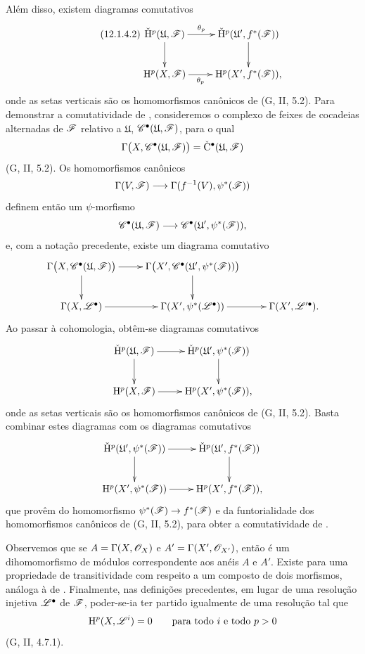 \begin{env}[12.1.4]
Além disso, existem diagramas comutativos
\[
\label{0.12.1.4.2}
\tag{12.1.4.2}
  \xymatrix{
    \check{\HH}^p(\mathfrak{U},\sh{F})
      \ar[r]^-{\theta_p}\ar[d]
      & \check{\HH}^p(\mathfrak{U}',f^*(\sh{F}))\ar[d]\\
    \HH^p(X,\sh{F})
      \ar[r]_-{\theta_p}
      & \HH^p(X',f^*(\sh{F})),
  }
\]
onde as setas verticais são os homomorfismos canônicos de
(G, II, 5.2).
Para demonstrar a comutatividade de , consideremos o
complexo de feixes de cocadeias alternadas de $\mathscr{F}$ relativo a
$\mathfrak{U}$,
$\mathscr{C}^\bullet(\mathfrak{U},\mathscr{F})$, para o qual
\[
  \Gamma\bigl(X,\mathscr{C}^\bullet(\mathfrak{U},\mathscr{F})\bigr)
  =
  \check{\mathrm{C}}^\bullet(\mathfrak{U},\mathscr{F})
\]
(G, II, 5.2).
Os homomorfismos canônicos
\[
  \Gamma(V,\mathscr{F})
  \longrightarrow
  \Gamma(f^{-1}(V),\psi^*(\mathscr{F}))
\]
definem então um $\psi$-morfismo
\[
  \mathscr{C}^\bullet(\mathfrak{U},\mathscr{F})
  \longrightarrow
  \mathscr{C}^\bullet(\mathfrak{U}',\psi^*(\mathscr{F})),
\]
e, com a notação precedente, existe um diagrama comutativo
\[
  \xymatrix{
    \Gamma\bigl(X,\sh{C}^\bullet(\mathfrak{U},\sh{F})\bigr)
      \ar[r]\ar[d]
      & \Gamma\bigl(X',
          \sh{C}^\bullet(\mathfrak{U}',\psi^*(\sh{F}))\bigr)\ar[d]\\
    \Gamma(X,\sh{L}^\bullet)\ar[r]
      & \Gamma(X',\psi^*(\sh{L}^\bullet))\ar[r]
      & \Gamma(X',\sh{L}'^\bullet).
  }
\]
Ao passar à cohomologia, obtêm-se diagramas comutativos
\[
  \xymatrix{
    \check{\HH}^p(\mathfrak{U},\sh{F})\ar[r]\ar[d]
      & \check{\HH}^p(\mathfrak{U}',\psi^*(\sh{F}))\ar[d]\\
    \HH^p(X,\sh{F})\ar[r]
      & \HH^p(X',\psi^*(\sh{F})),
  }
\]
onde as setas verticais são os homomorfismos canônicos de
(G, II, 5.2).
Basta combinar estes diagramas com os diagramas comutativos
\[
  \xymatrix{
    \check{\HH}^p(\mathfrak{U}',\psi^*(\sh{F}))\ar[r]\ar[d]
      & \check{\HH}^p(\mathfrak{U}',f^*(\sh{F}))\ar[d]\\
    \HH^p(X',\psi^*(\sh{F}))\ar[r]
      & \HH^p(X',f^*(\sh{F})),
  }
\]
que provêm do homomorfismo
$\psi^*(\sh{F})\to f^*(\sh{F})$ e da funtorialidade dos
homomorfismos canônicos de (G, II, 5.2), para obter a comutatividade
de .

Observemos que se
$A=\Gamma(X,\mathscr{O}_X)$ e $A'=\Gamma(X',\mathscr{O}_{X'})$, então
 é um dihomomorfismo de módulos correspondente aos
anéis $A$ e $A'$.
Existe para  uma propriedade de transitividade com respeito
a um composto de dois morfismos, análoga à de
.
Finalmente, nas definições precedentes, em lugar de uma resolução
injetiva $\mathscr{L}^\bullet$ de $\mathscr{F}$, poder-se-ia ter partido igualmente
de uma resolução tal que
\[
  \mathrm{H}^p(X,\mathscr{L}^i)=0
  \qquad\text{para todo $i$ e todo $p>0$}
\]
(G, II, 4.7.1).
\end{env}

